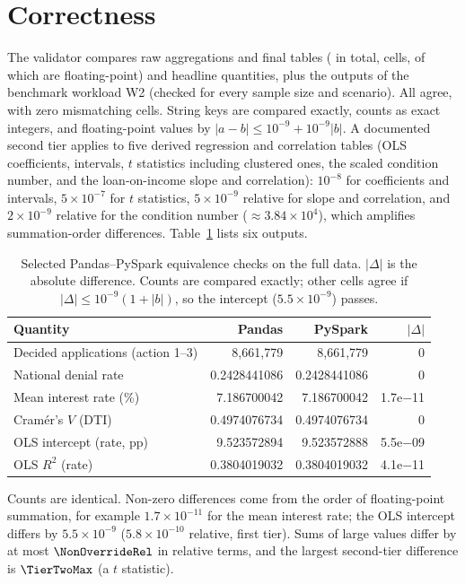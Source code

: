 \documentclass[acmtog,nonacm]{acmart}
\begin{document}
\section{Correctness}
The validator compares \NRawTables{} raw aggregations and \NFinalTables{} final tables (\NTables{} in total, \NCells{} cells, of which \NFloatCells{} are floating-point) and \NHeadline{} headline quantities, plus the \NBenchTables{} outputs of the benchmark workload W2 (checked for every sample size and scenario). All agree, with zero mismatching cells. String keys are compared exactly, counts as exact integers, and floating-point values by $|a-b|\le10^{-9}+10^{-9}|b|$. A documented second tier applies to five derived regression and correlation tables (OLS coefficients, intervals, $t$ statistics including clustered ones, the scaled condition number, and the loan-on-income slope and correlation): $10^{-8}$ for coefficients and intervals, $5\times10^{-7}$ for $t$ statistics, $5\times10^{-9}$ relative for slope and correlation, and $2\times10^{-9}$ relative for the condition number ($\approx3.84\times10^{4}$), which amplifies summation-order differences. Table~\ref{tab:corr} lists six outputs.

\begin{table}[t]
\caption{Selected Pandas--PySpark equivalence checks on the full data. $|\Delta|$ is the absolute difference. Counts are compared exactly; other cells agree if $|\Delta|\le10^{-9}(1+|b|)$, so the intercept ($5.5\times10^{-9}$) passes.}
\label{tab:corr}
\small
\setlength{\tabcolsep}{3pt}
\begin{tabular}{@{}lrrr@{}}
\toprule
Quantity & Pandas & PySpark & $|\Delta|$\\
\midrule
Decided applications (action 1--3) & 8,661,779 & 8,661,779 & 0 \\
National denial rate & 0.2428441086 & 0.2428441086 & 0 \\
Mean interest rate (\%) & 7.186700042 & 7.186700042 & 1.7e$-$11 \\
Cram\'er's $V$ (DTI) & 0.4974076734 & 0.4974076734 & 0 \\
OLS intercept (rate, pp) & 9.523572894 & 9.523572888 & 5.5e$-$09 \\
OLS $R^2$ (rate) & 0.3804019032 & 0.3804019032 & 4.1e$-$11 \\
\bottomrule
\end{tabular}
\end{table}

Counts are identical. Non-zero differences come from the order of floating-point summation, for example $1.7\times10^{-11}$ for the mean interest rate; the OLS intercept differs by $5.5\times10^{-9}$ ($5.8\times10^{-10}$ relative, first tier). Sums of large values differ by at most $\NonOverrideRel$ in relative terms, and the largest second-tier difference is $\TierTwoMax$ (a $t$ statistic).
\end{document}
